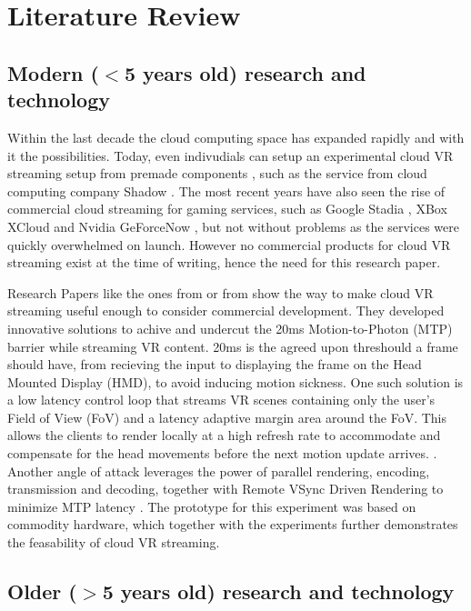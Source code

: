 \section{Literature Review}
\subsection{Modern ($<$5 years old) research and technology}

Within the last decade the cloud computing space has expanded rapidly and with it the possibilities. Today, even indivudials can setup an experimental cloud VR streaming setup from premade components \parencite{tayoexe}, such as the service from cloud computing company Shadow \parencite{shadow}. The most recent years have also seen the rise of commercial cloud streaming for gaming services, such as Google Stadia \parencite{stadia}, XBox XCloud \parencite{xcloud} and Nvidia GeForceNow \parencite{geforcenow}, but not without problems as the services were quickly overwhelmed on launch. However no commercial products for cloud VR streaming exist at the time of writing, hence the need for this research paper.

Research Papers like the ones from \cite{cutcord} or from \cite{mvr} show the way to make cloud VR streaming useful enough to consider commercial development. They developed innovative solutions to achive and undercut the 20ms Motion-to-Photon (MTP) barrier while streaming VR content. 20ms is the agreed upon threshould a frame should have, from recieving the input to displaying the frame on the Head Mounted Display (HMD), to avoid inducing motion sickness. One such solution is a low latency control loop that streams VR scenes containing only the user’s Field of View (FoV) and a latency adaptive margin area around the FoV. This allows the clients to render locally at a high refresh rate to accommodate and compensate for the head movements before the next motion update arrives. \parencite{mvr}. Another angle of attack  leverages the power of parallel rendering, encoding, transmission and decoding, together with Remote VSync Driven Rendering to minimize MTP latency \parencite{cutcord}. The prototype for this experiment was based on commodity hardware, which together with the experiments further demonstrates the feasability of cloud VR streaming.

\subsection{Older ($>$5 years old) research and technology} 

